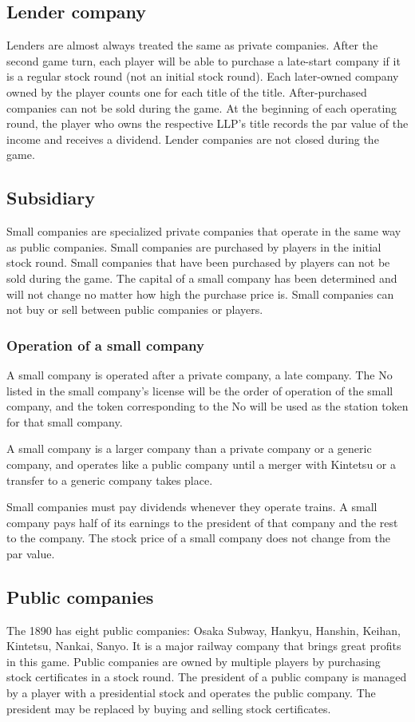 \documentclass{article}
\begin{document}
\begin{CJK}{UTF8}{min}
\subsection{Lender company}
Lenders are almost always treated the same as private companies. After
the second game turn, each player will be able to purchase a
late-start company if it is a regular stock round (not an initial
stock round). Each later-owned company owned by the player counts one
for each title of the title. After-purchased companies can not be sold
during the game. At the beginning of each operating round, the player
who owns the respective LLP's title records the par value of the
income and receives a dividend. Lender companies are not closed during
the game.

\subsection{Subsidiary}
Small companies are specialized private companies that operate in the
same way as public companies. Small companies are purchased by players
in the initial stock round. Small companies that have been purchased
by players can not be sold during the game. The capital of a small
company has been determined and will not change no matter how high the
purchase price is. Small companies can not buy or sell between public
companies or players.

\subsubsection{Operation of a small company}
A small company is operated after a private company, a late
company. The No listed in the small company's license will be the
order of operation of the small company, and the token corresponding
to the No will be used as the station token for that small company.

A small company is a larger company than a private company or a
generic company, and operates like a public company until a merger
with Kintetsu or a transfer to a generic company takes place.

Small companies must pay dividends whenever they operate trains. A
small company pays half of its earnings to the president of that
company and the rest to the company. The stock price of a small
company does not change from the par value.

\subsection{Public companies}
The 1890 has eight public companies: Osaka Subway, Hankyu, Hanshin,
Keihan, Kintetsu, Nankai, Sanyo. It is a major railway company that
brings great profits in this game. Public companies are owned by
multiple players by purchasing stock certificates in a stock
round. The president of a public company is managed by a player with a
presidential stock and operates the public company. The president may
be replaced by buying and selling stock certificates.


\end{CJK}
\end{document}
